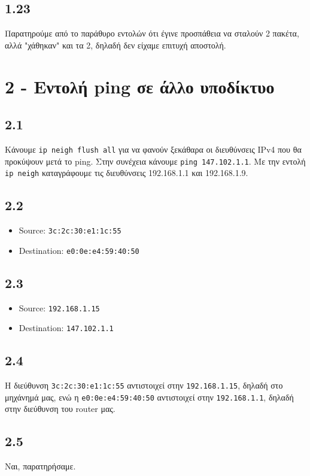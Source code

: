 		\subsection*{1.23}
			Παρατηρούμε από το παράθυρο εντολών ότι έγινε προσπάθεια να σταλούν 2 πακέτα, αλλά "χάθηκαν" και τα 2, δηλαδή δεν είχαμε επιτυχή αποστολή.
	
	\section*{2 - Εντολή ping σε άλλο υποδίκτυο}
	
		\subsection*{2.1}
			Κάνουμε \verb|ip neigh flush all| για να φανούν ξεκάθαρα οι διευθύνσεις IPv4 που θα προκύψουν μετά το ping. Στην συνέχεια κάνουμε \verb|ping 147.102.1.1|. Με την εντολή \verb|ip neigh| καταγράφουμε τις διευθύνσεις 192.168.1.1 και 192.168.1.9.
	
		\subsection*{2.2}
			\begin{itemize}
				\item Source: \verb|3c:2c:30:e1:1c:55| 
				\item Destination: \verb|e0:0e:e4:59:40:50|
			\end{itemize}
			
	
		\subsection*{2.3}
			\begin{itemize}
				\item Source: \verb|192.168.1.15|
				\item Destination: \verb|147.102.1.1|
			\end{itemize}
	
		\subsection*{2.4}
			Η διεύθυνση \verb|3c:2c:30:e1:1c:55| αντιστοιχεί στην \verb|192.168.1.15|, δηλαδή στο μηχάνημά μας, ενώ η \verb|e0:0e:e4:59:40:50| αντιστοιχεί στην \verb|192.168.1.1|, δηλαδή στην διεύθυνση του router μας.
	
		\subsection*{2.5}
			Ναι, παρατηρήσαμε.
	
